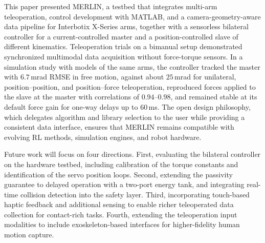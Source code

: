 \documentclass[a4paper, 10pt, conference]{ieeeconf}      %
\begin{document}
This paper presented MERLIN, a testbed that integrates multi-arm teleoperation, control development with MATLAB, and a camera-geometry-aware data pipeline for Interbotix X-Series arms, together with a sensorless bilateral controller for a current-controlled master and a position-controlled slave of different kinematics. Teleoperation trials on a bimanual setup demonstrated synchronized multimodal data acquisition without force-torque sensors. In a simulation study with models of the same arms, the controller tracked the master with $6.7$\,mrad RMSE in free motion, against about $25$\,mrad for unilateral, position--position, and position--force teleoperation, reproduced forces applied to the slave at the master with correlations of $0.94$--$0.98$, and remained stable at its default force gain for one-way delays up to $60$\,ms. The open design philosophy, which delegates algorithm and library selection to the user while providing a consistent data interface, ensures that MERLIN remains compatible with evolving RL methods, simulation engines, and robot hardware.

\hspace{1em}Future work will focus on four directions. First, evaluating the bilateral controller on the hardware testbed, including calibration of the torque constants and identification of the servo position loops. Second, extending the passivity guarantee to delayed operation with a two-port energy tank, and integrating real-time collision detection into the safety layer. Third, incorporating touch-based haptic feedback and additional sensing to enable richer teleoperated data collection for contact-rich tasks. Fourth, extending the teleoperation input modalities to include exoskeleton-based interfaces for higher-fidelity human motion capture.



\end{document}

